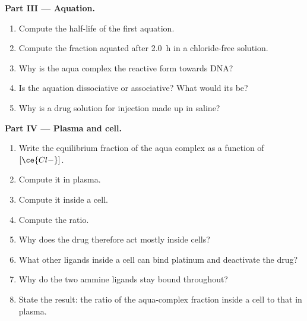 \begin{problem}
\medskip\noindent\textbf{Part III --- Aquation.}
\begin{enumerate}[resume]
  \item Compute the half-life of the first aquation.
  \item Compute the fraction aquated after \qty{2.0}{h} in a chloride-free solution.
  \item Why is the aqua complex the reactive form towards DNA?
  \item Is the aquation dissociative or associative? What would its  be?
  \item Why is a drug solution for injection made up in saline?
\end{enumerate}

\medskip\noindent\textbf{Part IV --- Plasma and cell.}
\begin{enumerate}[resume]
  \item Write the equilibrium fraction of the aqua complex as a function of
        $[\ce{Cl-}]$.
  \item Compute it in plasma.
  \item Compute it inside a cell.
  \item Compute the ratio.
  \item Why does the drug therefore act mostly inside cells?
  \item What other ligands inside a cell can bind platinum and deactivate the
        drug?
  \item Why do the two ammine ligands stay bound throughout?
  \item State the result: the ratio of the aqua-complex fraction inside a cell to
        that in plasma.
\end{enumerate}
\end{problem}
